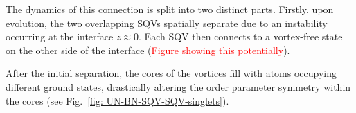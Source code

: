 The dynamics of this connection is split into two distinct parts.
Firstly, upon evolution, the two overlapping SQVs spatially separate due to an
instability occurring at the interface \(z \approx 0\).
Each SQV then connects to a vortex-free state on the other side of the
interface (\textcolor{red}{Figure showing this potentially}).

After the initial separation, the cores of the vortices fill with atoms
occupying different ground states, drastically altering the order parameter
symmetry within the cores (see Fig.~\ref{fig: UN-BN-SQV-SQV-singlets}).
\begin{figure}
    \centering
\end{figure}
